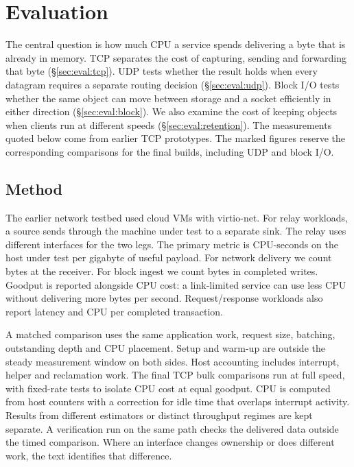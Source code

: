 \section{Evaluation}
\label{sec:eval}

The central question is how much CPU a service spends delivering a byte that
is already in memory. TCP separates the cost of capturing, sending and
forwarding that byte (\S\ref{sec:eval:tcp}). UDP tests whether the result holds
when every datagram requires a separate routing decision
(\S\ref{sec:eval:udp}). Block I/O tests whether the same object can move between
storage and a socket efficiently in either direction (\S\ref{sec:eval:block}).
We also examine the cost of keeping objects when clients run at different speeds
(\S\ref{sec:eval:retention}). The measurements quoted below come from earlier
TCP prototypes. The marked figures reserve the corresponding comparisons for the
final builds, including UDP and block I/O.

\subsection{Method}
\label{sec:eval:method}

The earlier network testbed used cloud VMs with virtio-net. For relay workloads,
a source sends through the machine under test to a separate sink. The relay
uses different interfaces for the two legs. The primary metric is CPU-seconds on the host under test per gigabyte of
useful payload. For network delivery we count bytes at the receiver. For block
ingest we count bytes in completed writes. Goodput is
reported alongside CPU cost: a link-limited service can use less CPU without
delivering more bytes per second. Request/response workloads also report
latency and CPU per completed transaction.

A matched comparison uses the same application work, request size, batching,
outstanding depth and CPU placement. Setup and warm-up are outside the steady
measurement window on both sides. Host accounting includes interrupt, helper
and reclamation work. The final TCP bulk comparisons run at full speed, with
fixed-rate tests to isolate CPU cost at equal goodput. CPU is computed from host counters with a correction for
idle time that overlaps interrupt activity. Results from different estimators or
distinct throughput regimes are kept separate. A verification run on the same
path checks the delivered data outside the timed comparison. Where an interface
changes ownership or does different work, the text identifies that difference.

